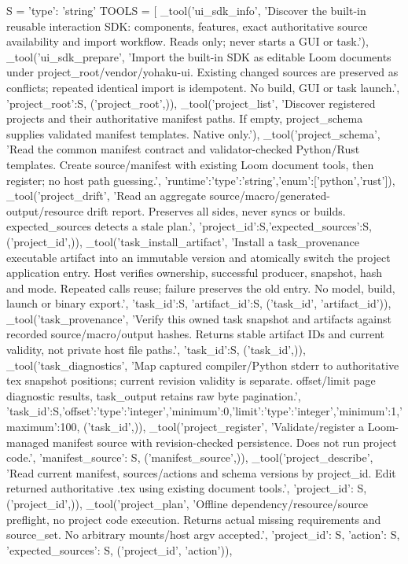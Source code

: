 S = {'type': 'string'}
TOOLS = [
    _tool('ui_sdk_info', 'Discover the built-in reusable interaction SDK: components, features, exact authoritative source availability and import workflow. Reads only; never starts a GUI or task.'),
    _tool('ui_sdk_prepare', 'Import the built-in SDK as editable Loom documents under project_root/vendor/yohaku-ui. Existing changed sources are preserved as conflicts; repeated identical import is idempotent. No build, GUI or task launch.', {'project_root':S}, ('project_root',)),
    _tool('project_list', 'Discover registered projects and their authoritative manifest paths. If empty, project_schema supplies validated manifest templates. Native only.'),
    _tool('project_schema', 'Read the common manifest contract and validator-checked Python/Rust templates. Create source/manifest with existing Loom document tools, then register; no host path guessing.', {'runtime':{'type':'string','enum':['python','rust']}}),
    _tool('project_drift', 'Read an aggregate source/macro/generated-output/resource drift report. Preserves all sides, never syncs or builds. expected_sources detects a stale plan.', {'project_id':S,'expected_sources':S}, ('project_id',)),
    _tool('task_install_artifact', 'Install a task_provenance executable artifact into an immutable version and atomically switch the project application entry. Host verifies ownership, successful producer, snapshot, hash and mode. Repeated calls reuse; failure preserves the old entry. No model, build, launch or binary export.', {'task_id':S, 'artifact_id':S}, ('task_id', 'artifact_id')),
    _tool('task_provenance', 'Verify this owned task snapshot and artifacts against recorded source/macro/output hashes. Returns stable artifact IDs and current validity, not private host file paths.', {'task_id':S}, ('task_id',)),
    _tool('task_diagnostics', 'Map captured compiler/Python stderr to authoritative tex snapshot positions; current revision validity is separate. offset/limit page diagnostic results, task_output retains raw byte pagination.', {'task_id':S,'offset':{'type':'integer','minimum':0},'limit':{'type':'integer','minimum':1,'maximum':100}}, ('task_id',)),
    _tool('project_register', 'Validate/register a Loom-managed manifest source with revision-checked persistence. Does not run project code.', {'manifest_source': S}, ('manifest_source',)),
    _tool('project_describe', 'Read current manifest, sources/actions and schema versions by project_id. Edit returned authoritative .tex using existing document tools.', {'project_id': S}, ('project_id',)),
    _tool('project_plan', 'Offline dependency/resource/source preflight, no project code execution. Returns actual missing requirements and source_set. No arbitrary mounts/host argv accepted.', {'project_id': S, 'action': S, 'expected_sources': S}, ('project_id', 'action')),
